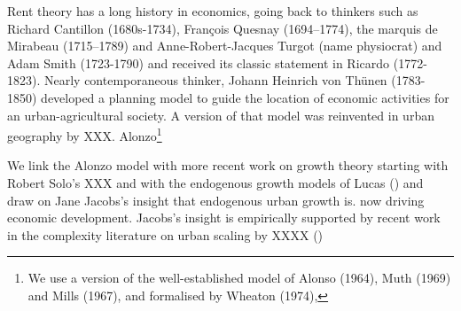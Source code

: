 Rent theory has a long history in economics, going back to thinkers such as Richard Cantillon (1680s-1734), François Quesnay (1694–1774), the marquis de Mirabeau (1715–1789) and Anne-Robert-Jacques Turgot (name physiocrat) and Adam Smith (1723-1790) and received its classic statement in Ricardo (1772-1823). Nearly contemporaneous thinker, Johann Heinrich  von Th\"unen (1783-1850) developed a planning model to guide the location of economic activities for an urban-agricultural society.  A version of that model  was reinvented in urban geography by XXX. Alonzo\footnote{We use a version of the well-established model of Alonso (1964), Muth (1969) and Mills (1967), and formalised by Wheaton (1974),}

We link the Alonzo model with more recent work on growth theory starting with Robert Solo's XXX and with the endogenous growth models of Lucas () and draw on Jane Jacobs's insight that endogenous urban growth  is. now driving economic development. Jacobs's insight is empirically supported by recent work in the complexity literature on urban scaling by XXXX ()





